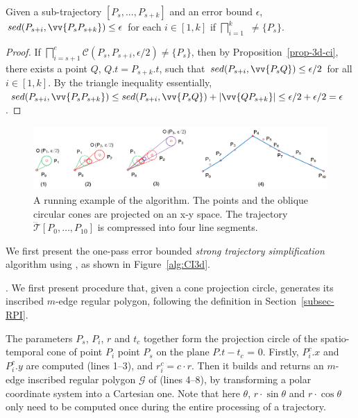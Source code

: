 \begin{prop}
\label{prop-3d-ci-half}
Given a sub-trajectory $[P_s,...,P_{s+k}]$ and an error bound $\epsilon$, $sed(P_{s+i}, \vv{P_sP_{s+k}})\le \epsilon$ for each $i \in [1,k]$ if  $\bigsqcap_{i=1}^{k}$ $\ne \{P_s\}$.
\end{prop}


\begin{proof}
If $\bigsqcap_{i=s+1}^{e}{\mathcal{C}(P_s, P_{s+i}, \epsilon/2)} \ne \{P_s\}$, then by Proposition~\ref{prop-3d-ci}, there exists a point $Q$, $Q.t = P_{s+k}.t$, such that $sed(P_{s+i}, \vv{P_sQ})\le \epsilon/2$ for all $i \in [1,k]$. By the triangle inequality essentially, $sed(P_{s+i}, \vv{P_sP_{s+k}})\le  sed(P_{s+i}, \vv{P_sQ}) + |\vv{QP_{s+k}}| \le  \epsilon/2+\epsilon/2 = \epsilon$.
\end{proof}



\begin{figure}[tb!]
	\centering
	\includegraphics[scale=0.8]{figures/Fig-Ex-Conest.png}
	\caption{\small A running example of the \cist algorithm. The points and the oblique circular cones are projected on an x-y space. The trajectory $\dddot{\mathcal{T}}[P_0, \ldots, P_{10}]$ is compressed into four line segments.}
	\vspace{-1ex}
	\label{fig:exm-const}
\end{figure}

 We first present the  one-pass error bounded {\em strong trajectory simplification} algorithm using \sed, as shown in Figure~\ref{alg:CI3d}.

.
We first present procedure  that, given a cone projection circle, generates its inscribed $m$-edge regular polygon,  following the definition in Section~\ref{subsec-RPI}.

The parameters $P_s$, $P_i$, $r$ and $t_c$ together form the projection circle  of the spatio-temporal cone  of point $P_{i}$ \wrt point $P_s$ on the plane $P.t - t_c$ = $0$. Firstly, $P^c_i.x$ and $P^c_i.y$ are computed (lines 1--3), and $r^c_i = c\cdot r$.
Then it builds and returns an $m$-edge inscribed regular polygon $\mathcal{G}$ of  (lines 4--8), by transforming a polar coordinate system
into a Cartesian one. Note that here $\theta$, $r\cdot\sin\theta$ and $r\cdot\cos\theta$ only need to be computed once during the entire processing of a trajectory.

